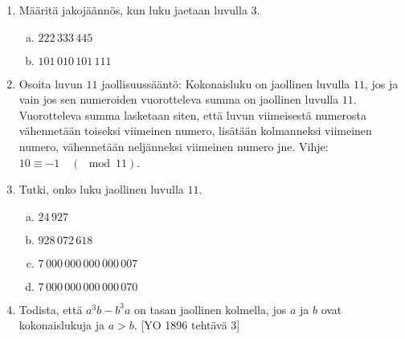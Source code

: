 \begin{tehtavasivu}
\begin{enumerate}
\item
Määritä jakojäännös, kun luku jaetaan luvulla $3$.
\begin{enumerate}[a)]
\item $222\, 333\, 445$
\item $101\, 010\, 101\, 111$
\end{enumerate}

\item
Osoita luvun $11$ jaollisuussääntö: Kokonaisluku on jaollinen luvulla $11$, jos ja vain jos sen numeroiden vuorotteleva summa on jaollinen luvulla $11$. Vuorotteleva summa lasketaan siten, että luvun viimeisestä numerosta vähennetään toiseksi viimeinen numero, lisätään kolmanneksi viimeinen numero, vähennetään neljänneksi viimeinen numero jne. Vihje: $10\equiv -1\quad(\mod 11)$.

\item Tutki, onko luku jaollinen luvulla $11$.
\begin{enumerate}[a)]
\item $24\, 927$
\item $928\, 072\, 618$
\item $7\, 000\, 000\, 000\, 000\, 007$
\item $7\, 000\, 000\, 000\, 000\, 070$
\end{enumerate}

\item Todista, että $a^3b-b^3a$ on tasan jaollinen kolmella, jos $a$ ja $b$ ovat kokonaislukuja ja $a>b$. 
[YO 1896 tehtävä 3]

\end{enumerate}
\end{tehtavasivu}
\newpage

